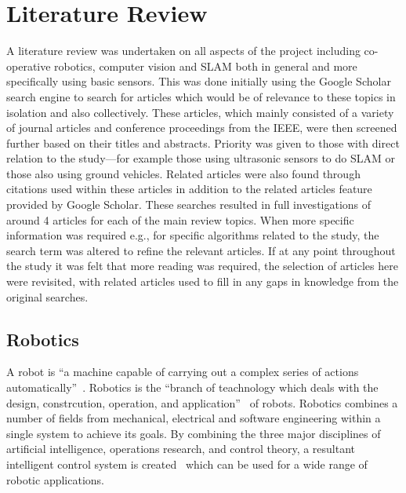 
\chapter{Literature Review}\label{litreview}
A literature review was undertaken on all aspects of the project including
co-operative robotics, computer vision and SLAM both in general and more
specifically using basic sensors. This was done initially using the Google
Scholar search engine to search for articles which would be of relevance to
these topics in isolation and also collectively. These articles, which mainly
consisted of a variety of journal articles and conference proceedings from
the IEEE, were then screened further based on their titles and abstracts.
Priority was given to those with direct relation to the study---for example
those using ultrasonic sensors to do SLAM or those also using ground vehicles.
Related articles were also found through citations used within these articles
in addition to the related articles feature provided by Google Scholar. These
searches resulted in full investigations of around 4 articles for each of the main
review topics. When more specific information was required e.g., for specific
algorithms related to the study, the search term was altered to refine the
relevant articles. If at any point throughout the study it was felt that more
reading was required, the selection of articles here were revisited, with
related articles used to fill in any gaps in knowledge from the original
searches.

\section{Robotics}\label{litreview/robotics}
A robot is ``a machine capable of carrying out a complex series of actions automatically''~\cite{https://en.oxforddictionaries.com/definition/robot}. Robotics is the ``branch of teachnology which deals with the design, constrcution, operation, and application''~\cite{https://www.merriam-webster.com/dictionary/robotics} of robots. Robotics combines a number of fields from mechanical, electrical and software engineering within a single system to achieve its goals. By combining the three major disciplines of artificial intelligence, operations research, and control theory, a resultant intelligent control system is created~\cite{https://ieeexplore.ieee.org/stamp/stamp.jsp?tp=&arnumber=1103278} which can be used for a wide range of robotic applications.   

